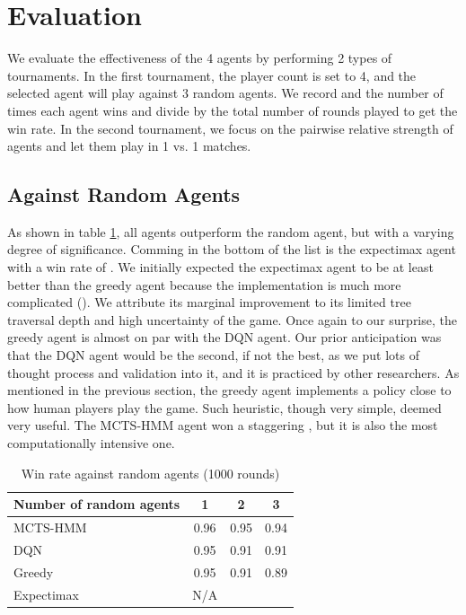\documentclass{article}
\begin{document}
\section{Evaluation}
We evaluate the effectiveness of the 4 agents by performing 2 types of tournaments. In the first tournament, the player count is set to 4, and the selected agent will play against 3 random agents. We record and the number of times each agent wins and divide by the total number of rounds played to get the win rate. In the second tournament, we focus on the pairwise relative strength of agents and let them play in 1 vs. 1 matches.
\subsection{Against Random Agents}
As shown in table \ref{tab:rand}, all agents outperform the random agent, but with a varying degree of significance. Comming in the bottom of the list is the expectimax agent with a win rate of \todo{}. We initially expected the expectimax agent to be at least better than the greedy agent because the implementation is much more complicated (). We attribute its marginal improvement to its limited tree traversal depth and high uncertainty of the game. Once again to our surprise, the greedy agent is almost on par with the DQN agent. Our prior anticipation was that the DQN agent would be the second, if not the best, as we put lots of thought process and validation into it, and it is practiced by other researchers. As mentioned in the previous section, the greedy agent implements a policy close to how human players play the game. Such heuristic, though very simple, deemed very useful. \todo{} The MCTS-HMM agent won a staggering , but it is also the most computationally intensive one. 
\begin{table}[htbp]
    \centering
    \begin{tabular}{l c c c}
    \toprule
        Number of random agents & 1 & 2 & 3 \\\hline
        MCTS-HMM & 0.96 & 0.95 & 0.94 \\
        DQN & 0.95 & 0.91 & 0.91 \\
        Greedy & 0.95 & 0.91 & 0.89 \\
        Expectimax & N/A & & \\
    \bottomrule
    \end{tabular}
    \caption{Win rate against random agents (1000 rounds) }
    \label{tab:rand}
\end{table}
\end{document}
